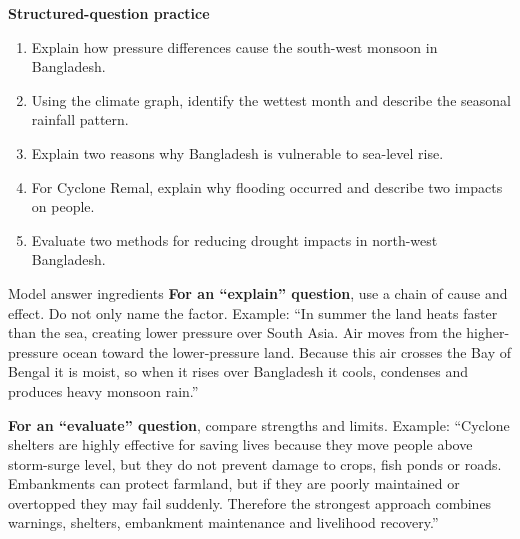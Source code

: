 \documentclass[11pt,a4paper]{article}
\begin{document}
\begin{center}
\end{center}

\begin{examcheck}
\textbf{Structured-question practice}
\begin{enumerate}
  \item Explain how pressure differences cause the south-west monsoon in Bangladesh.
  \item Using the climate graph, identify the wettest month and describe the seasonal rainfall pattern.
  \item Explain two reasons why Bangladesh is vulnerable to sea-level rise.
  \item For Cyclone Remal, explain why flooding occurred and describe two impacts on people.
  \item Evaluate two methods for reducing drought impacts in north-west Bangladesh.
\end{enumerate}
\end{examcheck}

\begin{keybox}{Model answer ingredients}
\textbf{For an ``explain'' question}, use a chain of cause and effect. Do not only name the factor. Example: ``In summer the land heats faster than the sea, creating lower pressure over South Asia. Air moves from the higher-pressure ocean toward the lower-pressure land. Because this air crosses the Bay of Bengal it is moist, so when it rises over Bangladesh it cools, condenses and produces heavy monsoon rain.''

\textbf{For an ``evaluate'' question}, compare strengths and limits. Example: ``Cyclone shelters are highly effective for saving lives because they move people above storm-surge level, but they do not prevent damage to crops, fish ponds or roads. Embankments can protect farmland, but if they are poorly maintained or overtopped they may fail suddenly. Therefore the strongest approach combines warnings, shelters, embankment maintenance and livelihood recovery.''
\end{keybox}
\end{document}
